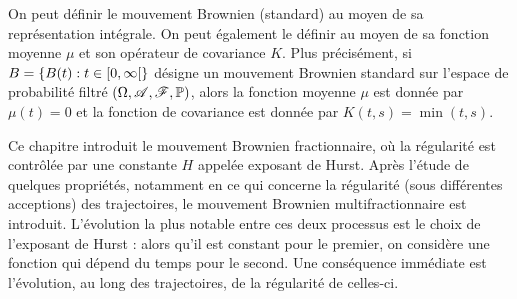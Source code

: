 On peut définir le mouvement Brownien (standard) au moyen de sa
représentation intégrale. On peut également le définir au moyen de sa
fonction moyenne $\mu$ et son opérateur de covariance $K$. Plus
précisément, si $B = \{B(t) : t \in \left[0,\infty\right[\}$ désigne un
mouvement Brownien standard sur l'espace de probabilité filtré
$\left(\Omega, \mathscr{A}, \mathscr{F}, \mathbb{P}\right)$, alors la fonction moyenne $\mu$
est donnée par $\mu(t) = 0$ et la fonction de covariance est donnée
par $K(t,s) = \min(t,s)$.

Ce chapitre introduit le mouvement Brownien fractionnaire, où la
régularité est contrôlée par une constante $H$ appelée exposant de
Hurst. Après l'étude de quelques propriétés, notamment en ce qui
concerne la régularité (sous différentes acceptions) des trajectoires,
le mouvement Brownien multifractionnaire est introduit. L'évolution la
plus notable entre ces deux processus est le choix de l'exposant de
Hurst : alors qu'il est constant pour le premier, on considère une
fonction qui dépend du temps pour le second. Une conséquence immédiate
est l'évolution, au long des trajectoires, de la régularité de
celles-ci.